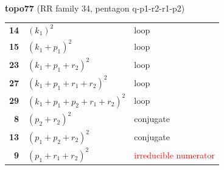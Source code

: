\documentclass[10pt]{article}
\begin{document}
\begin{minipage}[t]{0.48\textwidth}
{}\\[2mm]\textbf{topo77} (RR family 34, pentagon q-p1-r2-r1-p2)\\[2pt]{\footnotesize\begin{tabular}{@{}r@{\ \ }l@{\ \ }l@{}}\textbf{14} & $(k_1)^2$ & loop\\
\textbf{15} & $(k_1+p_1)^2$ & loop\\
\textbf{23} & $(k_1+p_1+r_2)^2$ & loop\\
\textbf{27} & $(k_1+p_1+r_1+r_2)^2$ & loop\\
\textbf{29} & $(k_1+p_1+p_2+r_1+r_2)^2$ & loop\\
\textbf{8} & $(p_2+r_2)^2$ & conjugate\\
\textbf{13} & $(p_1+p_2+r_2)^2$ & conjugate\\
\textbf{9} & $(p_1+r_1+r_2)^2$ & \textcolor{red}{irreducible numerator}\\\end{tabular}}\end{minipage}\hfill%
\end{document}
